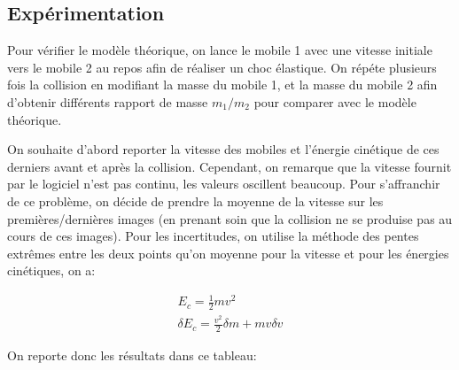 \documentclass[12pt]{article}
\begin{document}
\subsection{Expérimentation}
Pour vérifier le modèle théorique, on lance le mobile 1 avec une vitesse initiale vers le mobile 2 au repos afin de réaliser un choc élastique.
On répéte plusieurs fois la collision en modifiant la masse du mobile 1, et la masse du mobile 2 afin d'obtenir différents rapport de masse $m_1/m_2$ pour comparer avec
le modèle théorique.

On souhaite d'abord reporter la vitesse des mobiles et l'énergie cinétique de ces derniers avant et après la collision. Cependant, on remarque que la vitesse 
fournit par le logiciel n'est pas continu, les valeurs oscillent beaucoup. Pour s'affranchir de ce problème, on décide de prendre la moyenne de la vitesse sur les premières/dernières images
(en prenant soin que la collision ne se produise pas au cours de ces images). Pour les incertitudes, on utilise la méthode des pentes extrêmes entre les deux points qu'on moyenne pour la vitesse et pour les énergies cinétiques, on a:

\begin{gather}
    E_c = \frac{1}{2} m v^2 \\
    \delta E_c = \frac{v^2}{2} \delta m + mv \delta v
\end{gather}

\newpage
On reporte donc les résultats dans ce tableau:
\end{document}
